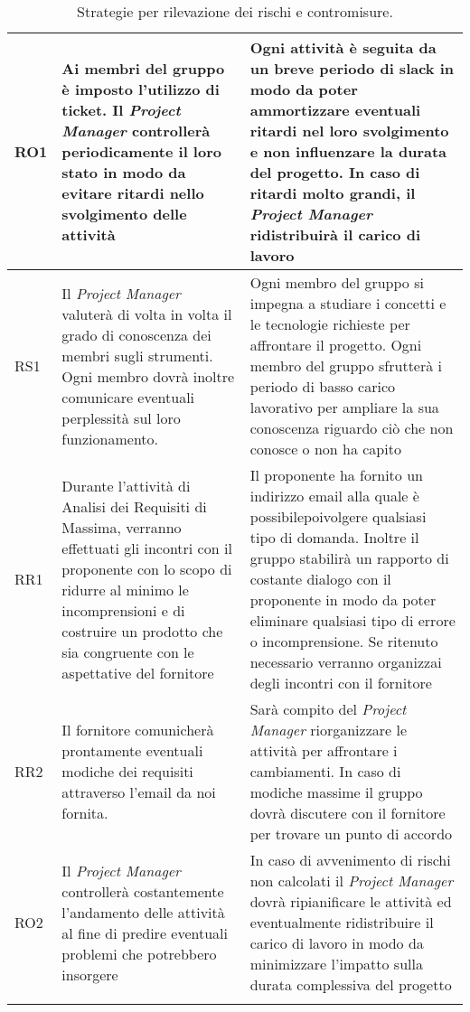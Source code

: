 \begin{longtable}[H]{|l|C{5cm}|C{7cm}|}
		\hline
		RO1     & Ai membri del gruppo è imposto l'utilizzo di ticket. Il \emph{Project Manager} controllerà periodicamente il loro stato in modo da evitare ritardi nello svolgimento delle attività & Ogni attività è seguita da un breve periodo di slack in modo da poter ammortizzare eventuali ritardi nel loro svolgimento e non influenzare la durata del progetto. In caso di ritardi molto grandi, il \emph{Project Manager} ridistribuirà il carico di lavoro\\  
		\hline
		RS1     & Il \emph{Project Manager} valuterà di volta in volta il grado di conoscenza dei membri sugli strumenti. Ogni membro dovrà inoltre comunicare eventuali perplessità sul loro funzionamento. & Ogni membro del gruppo si impegna a studiare i concetti e le tecnologie richieste per affrontare il progetto. Ogni membro del gruppo sfrutterà i periodo di basso carico lavorativo per ampliare la sua conoscenza riguardo ciò che non conosce o non ha capito\\
		\hline
		RR1     & Durante l'attività di Analisi dei Requisiti di Massima, verranno effettuati gli incontri con il proponente con lo scopo di ridurre al minimo le incomprensioni e di costruire un prodotto che sia congruente con le aspettative del fornitore  & Il proponente ha fornito un indirizzo email alla quale è possibilepoivolgere qualsiasi tipo di domanda. Inoltre il gruppo stabilirà un rapporto di costante dialogo con il proponente in modo da poter eliminare qualsiasi tipo di errore o incomprensione. Se ritenuto necessario verranno organizzai degli incontri con il fornitore\\
		\hline
		RR2 & Il fornitore comunicherà prontamente eventuali modiche dei requisiti attraverso l'email da noi fornita. & Sarà compito del \emph{Project Manager} riorganizzare le attività per affrontare i cambiamenti. In caso di modiche massime il gruppo dovrà discutere con il fornitore per trovare un punto di accordo\\
		\hline                                                                                                                           
		RO2 & Il \emph{Project Manager} controllerà costantemente l'andamento delle attività al fine di predire eventuali problemi che potrebbero insorgere & In caso di avvenimento di rischi non calcolati il \emph{Project Manager} dovrà ripianificare le attività ed eventualmente ridistribuire il carico di lavoro in modo da minimizzare l'impatto sulla durata complessiva del progetto\\
		\hline
		\caption{Strategie per rilevazione dei rischi e contromisure.}
\end{longtable}





